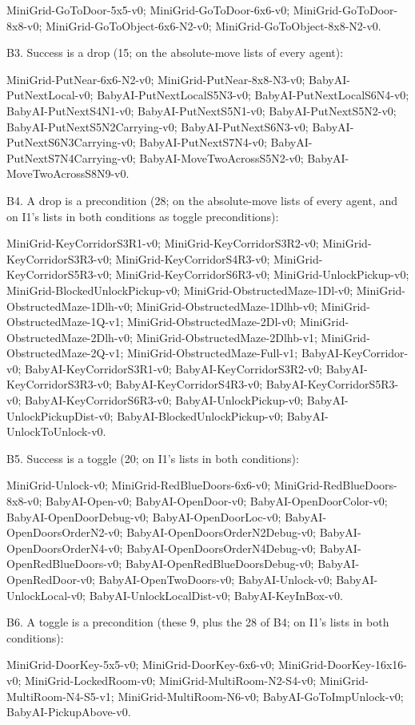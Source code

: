 \documentclass[journal,onecolumn]{IEEEtran}
\begin{document}
MiniGrid-GoToDoor-5x5-v0; MiniGrid-GoToDoor-6x6-v0;
MiniGrid-GoToDoor-8x8-v0; MiniGrid-GoToObject-6x6-N2-v0;
MiniGrid-GoToObject-8x8-N2-v0.

B3. Success is a drop (15; on the absolute-move lists of every agent):

MiniGrid-PutNear-6x6-N2-v0; MiniGrid-PutNear-8x8-N3-v0;
BabyAI-PutNextLocal-v0; BabyAI-PutNextLocalS5N3-v0;
BabyAI-PutNextLocalS6N4-v0; BabyAI-PutNextS4N1-v0;
BabyAI-PutNextS5N1-v0; BabyAI-PutNextS5N2-v0;
BabyAI-PutNextS5N2Carrying-v0; BabyAI-PutNextS6N3-v0;
BabyAI-PutNextS6N3Carrying-v0; BabyAI-PutNextS7N4-v0;
BabyAI-PutNextS7N4Carrying-v0; BabyAI-MoveTwoAcrossS5N2-v0;
BabyAI-MoveTwoAcrossS8N9-v0.

B4. A drop is a precondition (28; on the absolute-move lists of every
agent, and on I1's lists in both conditions as toggle preconditions):

MiniGrid-KeyCorridorS3R1-v0; MiniGrid-KeyCorridorS3R2-v0;
MiniGrid-KeyCorridorS3R3-v0; MiniGrid-KeyCorridorS4R3-v0;
MiniGrid-KeyCorridorS5R3-v0; MiniGrid-KeyCorridorS6R3-v0;
MiniGrid-UnlockPickup-v0; MiniGrid-BlockedUnlockPickup-v0;
MiniGrid-ObstructedMaze-1Dl-v0; MiniGrid-ObstructedMaze-1Dlh-v0;
MiniGrid-ObstructedMaze-1Dlhb-v0; MiniGrid-ObstructedMaze-1Q-v1;
MiniGrid-ObstructedMaze-2Dl-v0; MiniGrid-ObstructedMaze-2Dlh-v0;
MiniGrid-ObstructedMaze-2Dlhb-v1; MiniGrid-ObstructedMaze-2Q-v1;
MiniGrid-ObstructedMaze-Full-v1; BabyAI-KeyCorridor-v0;
BabyAI-KeyCorridorS3R1-v0; BabyAI-KeyCorridorS3R2-v0;
BabyAI-KeyCorridorS3R3-v0; BabyAI-KeyCorridorS4R3-v0;
BabyAI-KeyCorridorS5R3-v0; BabyAI-KeyCorridorS6R3-v0;
BabyAI-UnlockPickup-v0; BabyAI-UnlockPickupDist-v0;
BabyAI-BlockedUnlockPickup-v0; BabyAI-UnlockToUnlock-v0.

B5. Success is a toggle (20; on I1's lists in both conditions):

MiniGrid-Unlock-v0; MiniGrid-RedBlueDoors-6x6-v0;
MiniGrid-RedBlueDoors-8x8-v0; BabyAI-Open-v0; BabyAI-OpenDoor-v0;
BabyAI-OpenDoorColor-v0; BabyAI-OpenDoorDebug-v0; BabyAI-OpenDoorLoc-v0;
BabyAI-OpenDoorsOrderN2-v0; BabyAI-OpenDoorsOrderN2Debug-v0;
BabyAI-OpenDoorsOrderN4-v0; BabyAI-OpenDoorsOrderN4Debug-v0;
BabyAI-OpenRedBlueDoors-v0; BabyAI-OpenRedBlueDoorsDebug-v0;
BabyAI-OpenRedDoor-v0; BabyAI-OpenTwoDoors-v0; BabyAI-Unlock-v0;
BabyAI-UnlockLocal-v0; BabyAI-UnlockLocalDist-v0; BabyAI-KeyInBox-v0.

B6. A toggle is a precondition (these 9, plus the 28 of B4; on I1's
lists in both conditions):

MiniGrid-DoorKey-5x5-v0; MiniGrid-DoorKey-6x6-v0;
MiniGrid-DoorKey-16x16-v0; MiniGrid-LockedRoom-v0;
MiniGrid-MultiRoom-N2-S4-v0; MiniGrid-MultiRoom-N4-S5-v1;
MiniGrid-MultiRoom-N6-v0; BabyAI-GoToImpUnlock-v0;
BabyAI-PickupAbove-v0.
\end{document}
